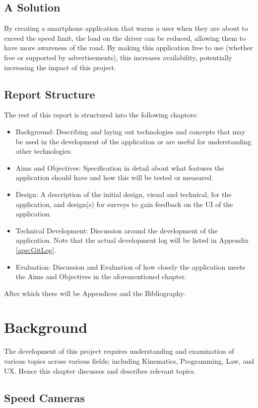 \documentclass[11pt, a4paper, notitlepage]{report}
\begin{document}
\section{A Solution}
By creating a smartphone application that warns a user when they are about to exceed the speed limit, the load on the driver can be reduced, allowing them to have more awareness of the road. By making this application free to use (whether free or supported by advertisements), this increases availability, potentially increasing the impact of this project.
\section{Report Structure}
The rest of this report is structured into the following chapters:
\begin{itemize}
	\item Background: Describing and laying out technologies and concepts that may be used in the development of the application or are useful for understanding other technologies.
	\item Aims and Objectives: Specification in detail about what features the application should have and how this will be tested or measured.
	\item Design: A description of the initial design, visual and technical, for the application, and design(s) for surveys to gain feedback on the UI of the application.
	\item Technical Development: Discussion around the development of the application. Note that the actual development log will be listed in Appendix \ref{app:GitLog}.
    \item Evaluation: Discussion and Evaluation of how closely the application meets the Aims and Objectives in the aforementioned chapter.
\end{itemize}
After which there will be Appendices and the Bibliography. %
\chapter{Background}
The development of this project requires understanding and examination of various topics across various fields; including Kinematics, Programming, Law, and UX. Hence this chapter discusses and describes relevant topics.
\section{Speed Cameras}
\end{document}
